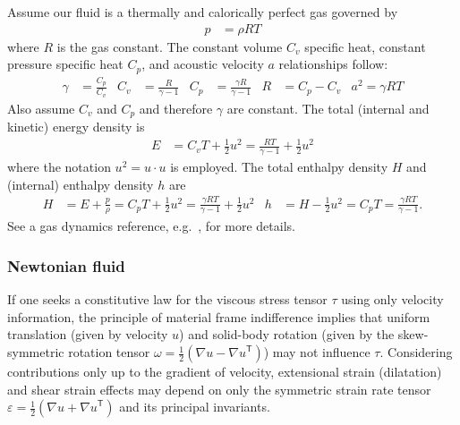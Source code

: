 \documentclass[letterpaper,11pt,nointlimits,reqno,draft]{amsart}
\newcommand{\trans}[1]{{#1}^{\ensuremath{\mathsf{T}}}}
\begin{document}
Assume our fluid is a thermally and calorically perfect gas governed by
\begin{align}
  \label{eq:perfectgaseos}
  p &= \rho{} R T
\end{align}
where $R$ is the gas constant. The constant volume $C_{v}$ specific heat,
constant pressure specific heat $C_{p}$, and acoustic velocity $a$
relationships follow:
\begin{align}
  \label{eq:perfectgasrelations}
  \gamma &= \frac{C_{p}}{C_{v}}
  &
  C_{v} &= \frac{R}{\gamma - 1}
  &
  C_{p} &= \frac{\gamma{}R}{\gamma-1}
  &
  R &= C_{p} - C_{v}
  &
  a^{2} = \gamma{}RT
\end{align}
Also assume $C_{v}$ and $C_{p}$ and therefore $\gamma$ are constant.
The total (internal and kinetic) energy density is
\begin{align}
  \label{eq:perfectgastotalenergy}
  E &= C_{v} T + \frac{1}{2}u^{2}
     = \frac{RT}{\gamma-1} + \frac{1}{2}u^{2}
\end{align}
where the notation $u^2 = u\cdot{}u$ is employed.
The total enthalpy density $H$ and (internal) enthalpy density $h$ are
\begin{align}
  \label{eq:perfectgasenthalpy}
  H &= E + \frac{p}{\rho}
     = C_{p} T + \frac{1}{2}u^{2}
     = \frac{\gamma{}RT}{\gamma-1} + \frac{1}{2}u^{2}
  &
  h &= H - \frac{1}{2}u^{2}
     = C_{p} T
     = \frac{\gamma{}RT}{\gamma-1}
  .
\end{align}
See a gas dynamics reference, e.g.~\citet{LiepmannRoshko2002}, for more
details.

\subsubsection{Newtonian fluid}
\label{sec:newtonianfluid}

If one seeks a constitutive law for the viscous stress tensor $\tau$
using only velocity information, the principle of material frame
indifference implies that uniform translation (given by velocity $u$)
and solid-body rotation (given by the skew-symmetric rotation tensor
$\omega=\frac{1}{2}\left( \nabla{}u-\trans{\nabla{}u} \right)$)
may not influence $\tau$.  Considering contributions only up to the
gradient of velocity, extensional strain (dilatation) and shear strain
effects may depend on only the symmetric strain rate tensor
$\varepsilon=\frac{1}{2}\left( \nabla{}u+\trans{\nabla{}u}\right)$
and its principal invariants.
\end{document}

